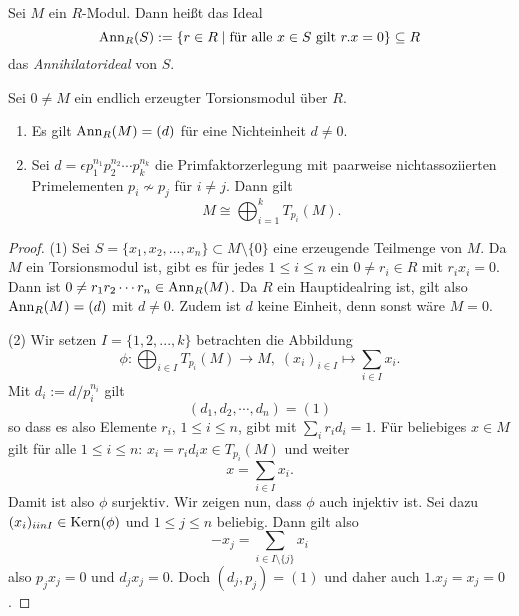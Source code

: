 \documentclass{book}
\begin{document}
\begin{defi}
    \label{defi:ann} Sei $M$ ein $R$-Modul. 
            Dann heißt das Ideal
            \[
                \operatorname{Ann}_R(S) := \{ r \in R\;|\; \text{für alle $x \in S$ gilt $r.x = 0$}\} \subseteq R
            \]
            das \emph{Annihilatorideal} von $S$.
\end{defi}

\begin{prop}
    \label{prop:torfin}
    Sei $0 \ne M$ ein endlich erzeugter Torsionsmodul über $R$. 
    \begin{enumerate}
        \item Es gilt $\operatorname{Ann}_R(M) = (d)$ für eine Nichteinheit $d \ne 0$. 
        \item Sei $d = \epsilon p_1^{n_1} p_2^{n_2} \cdots p_k^{n_k}$ die
            Primfaktorzerlegung mit paarweise nichtassoziierten Primelementen
            $p_i \not \sim p_j$ für $i \ne j$. Dann gilt
            \[
                M \cong \bigoplus_{i = 1}^k T_{p_i}(M).
            \]
    \end{enumerate}
\end{prop}
\begin{proof}
    (1) Sei $S= \{x_1, x_2, ..., x_n\} \subset M \setminus \{0\}$ eine
    erzeugende Teilmenge von $M$. Da $M$ ein Torsionsmodul ist, gibt es für
    jedes $1 \le i \le n$ ein $0 \ne r_i \in R$ mit $r_i x_i = 0$. Dann ist $0 \ne r_1 r_2 \cdots r_n \in
    \operatorname{Ann}_R(M)$. Da $R$ ein Hauptidealring ist, gilt also $\operatorname{Ann}_R(M) = (d)$ mit
    $d \ne 0$. Zudem ist $d$ keine Einheit, denn sonst wäre $M = 0$. 

    (2) Wir setzen $I = \{1,2,...,k\}$ betrachten die Abbildung
    \[
        \phi: \bigoplus_{i \in I} T_{p_i}(M) \to M, \; (x_i)_{i \in I} \mapsto \sum_{i \in I} x_i.
    \]
    Mit $d_i := d/p_i^{n_i}$ gilt
    \[
        (d_1, d_2, \cdots, d_n) = (1)
    \]
    so dass es also Elemente $r_i$, $1 \le i \le n$, gibt mit $\sum_i r_i d_i = 1$. Für
    beliebiges $x \in M$ gilt für alle $1 \le i \le n$: $x_i = r_i d_i x \in T_{p_i}(M)$ und weiter
    \[
        x = \sum_{i \in I} x_i.
    \]
    Damit ist also $\phi$ surjektiv. Wir zeigen nun, dass $\phi$ auch injektiv
    ist. Sei dazu $(x_i)_{i in I} \in \Kern(\phi)$ und $1 \le j \le n$ beliebig. Dann gilt
    also
    \[
        -x_j = \sum_{i \in I \setminus \{j\} } x_i
    \]
    also $p_j x_j = 0$ und $d_j x_j = 0$. Doch $(d_j,p_j) = (1)$ und daher
    auch $1.x_j = x_j = 0$. 
\end{proof}
\end{document}
